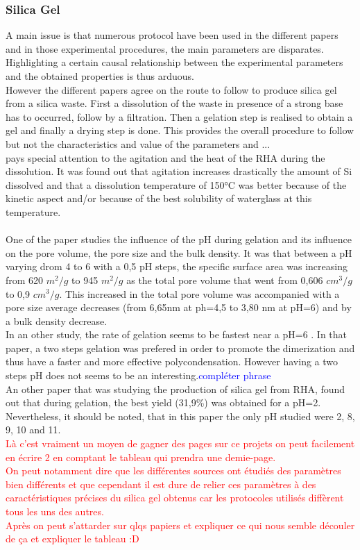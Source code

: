 \documentclass[12pt,a4paper]{article}
\begin{document}
\subsubsection*{Silica Gel}
A main issue is that numerous protocol have been used in the different papers and in those experimental procedures, the main parameters are disparates. Highlighting a certain causal relationship between the experimental parameters and the obtained properties is thus arduous.
\\However the different papers \cite{julie} \cite{Fengge} agree on the route to follow to produce silica gel from a silica waste. First a dissolution of the waste in presence of a strong base has to occurred, follow by a filtration. Then a gelation step is realised to obtain a gel and finally a drying step is done. This provides the overall procedure to follow but not the characteristics and value of the parameters and ...
\\\cite{Pin} pays special attention to the agitation and the heat of the RHA during the dissolution. It was found \cite{julie} out that agitation increases drastically the amount of Si dissolved and that a dissolution temperature of 150°C was better because of the kinetic aspect and/or because of the best solubility of waterglass at this temperature.
\\
\\One of the paper \cite{Fengge} studies the influence of the pH during gelation and its influence on the pore volume, the pore size and the bulk density. It was  that between a pH varying drom 4 to 6 with a 0,5 pH steps, the specific surface area was increasing from 620 $m^2/g$ to 945 $m^2/g$ as the total pore volume that went from 0,606 $cm^3/g$ to 0,9 $cm^3/g$. This increased in the total pore volume was accompanied with a pore size average decreases (from 6,65nm at ph=4,5 to 3,80 nm at pH=6) and by a bulk density decrease.
\\In an other study, the rate of gelation seems to be fastest near a pH=6 \cite{julie}. In that paper, a two steps gelation was prefered in order to promote the dimerization and thus have a faster and more effective polycondensation. However having a two steps pH does not seems to be an interesting.\textcolor{blue}{compléter phrase}
\\An other paper that was studying the production of silica gel from RHA, found out that during gelation, the best yield (31,9\%) was obtained for a pH=2.  Nevertheless, it should be noted, that in this paper the only pH studied were 2, 8, 9, 10 and 11.
\\
\textcolor{red}{Là c'est vraiment un moyen de gagner des pages sur ce projets on peut facilement en écrire 2 en comptant le tableau qui prendra une demie-page.
\\On peut notamment dire que les différentes sources ont étudiés des paramètres bien différents et que cependant il est dure de relier ces paramètres à des caractéristiques précises du silica gel obtenus car les protocoles utilisés diffèrent tous les uns des autres.
\\Après on peut s'attarder sur qlqs papiers et expliquer ce qui nous semble découler de ça et expliquer le tableau :D}
\end{document}
